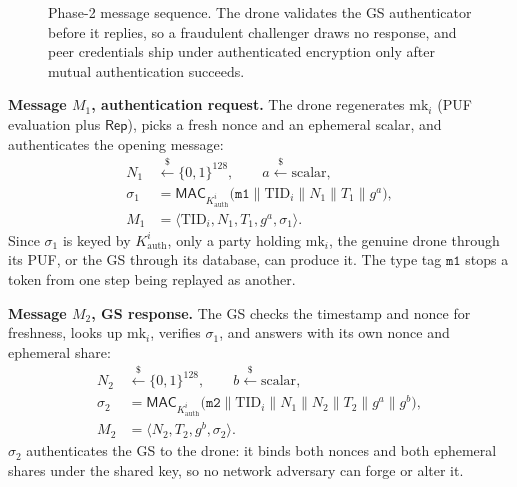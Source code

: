\documentclass[journal]{IEEEtran}
\begin{document}
\begin{figure}[H]
\centering
{}
\caption{Phase-2 message sequence. The drone validates the GS authenticator
before it replies, so a fraudulent challenger draws no response, and peer
credentials ship under authenticated encryption only after mutual
authentication succeeds.}
\label{fig:phase2}
\end{figure}

\textbf{Message $M_1$, authentication request.} The drone regenerates
$\text{mk}_i$ (PUF evaluation plus $\mathsf{Rep}$), picks a fresh nonce and an
ephemeral scalar, and authenticates the opening message:
\begin{align}
N_1 &\xleftarrow{\$} \{0,1\}^{128}, \qquad a \xleftarrow{\$} \text{scalar},\\
\sigma_1 &= \mathsf{MAC}_{K^{i}_{\text{auth}}}\big(\texttt{m1} \| \text{TID}_i \| N_1 \| T_1 \| g^{a}\big),\\
M_1 &= \langle \text{TID}_i, N_1, T_1, g^{a}, \sigma_1 \rangle.
\end{align}
Since $\sigma_1$ is keyed by $K^{i}_{\text{auth}}$, only a party holding
$\text{mk}_i$, the genuine drone through its PUF, or the GS through its
database, can produce it. The type tag $\texttt{m1}$ stops a token from one
step being replayed as another.

\textbf{Message $M_2$, GS response.} The GS checks the timestamp and nonce for
freshness, looks up $\text{mk}_i$, verifies $\sigma_1$, and answers with its own
nonce and ephemeral share:
\begin{align}
N_2 &\xleftarrow{\$} \{0,1\}^{128}, \qquad b \xleftarrow{\$} \text{scalar},\\
\sigma_2 &= \mathsf{MAC}_{K^{i}_{\text{auth}}}\big(\texttt{m2} \| \text{TID}_i \| N_1 \| N_2 \| T_2 \| g^{a} \| g^{b}\big),\\
M_2 &= \langle N_2, T_2, g^{b}, \sigma_2 \rangle.
\end{align}
$\sigma_2$ authenticates the GS to the drone: it binds both nonces and both
ephemeral shares under the shared key, so no network adversary can forge or
alter it.
\end{document}
